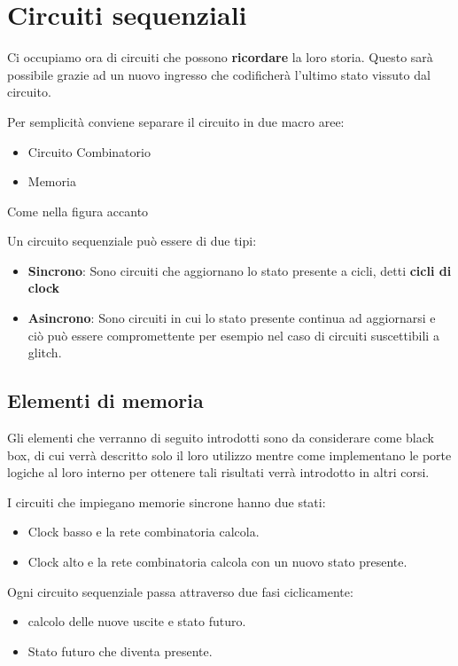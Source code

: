 \documentclass[a4paper]{book}
\begin{document}
\section{Circuiti sequenziali}
Ci occupiamo ora di circuiti che possono \textbf{ricordare} la loro storia.
Questo sarà possibile grazie ad un nuovo ingresso che codificherà l'ultimo stato vissuto dal circuito.

Per semplicità conviene separare il circuito in due macro aree:

\begin{itemize}
\item Circuito Combinatorio
\item Memoria
\end{itemize}

Come nella figura accanto

Un circuito sequenziale può essere di due tipi:
\begin{itemize}
\item \textbf{Sincrono}: Sono circuiti che aggiornano lo stato presente a cicli, detti \textbf{cicli di clock}
\item \textbf{Asincrono}: Sono circuiti in cui lo stato presente continua ad aggiornarsi e ciò può essere compromettente per esempio nel caso di circuiti suscettibili a glitch.
\end{itemize}


\subsection{Elementi di memoria}

Gli elementi che verranno di seguito introdotti sono da considerare come black box, di cui verrà descritto solo il loro utilizzo mentre come implementano le porte logiche al loro interno per ottenere tali risultati verrà introdotto in altri corsi.

I circuiti che impiegano memorie sincrone hanno due stati:

\begin{itemize}
\item Clock basso e la rete combinatoria calcola.
\item Clock alto e  la rete combinatoria calcola con un nuovo stato presente.
\end{itemize}




Ogni circuito sequenziale passa attraverso due fasi ciclicamente:
\begin{itemize}
\item{} calcolo delle nuove uscite e stato futuro.
\item{} Stato futuro che diventa presente.
\end{itemize}
\end{document}
